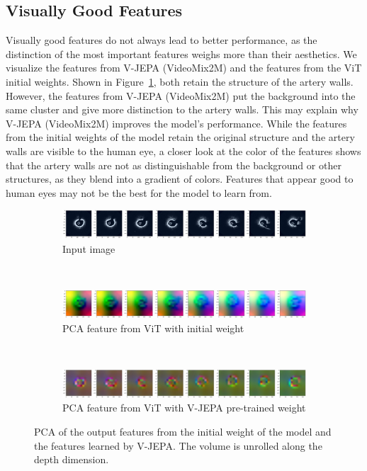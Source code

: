 \documentclass[a4paper,11pt,oneside]{report}
\begin{document}
\subsection{Visually Good Features}
Visually good features do not always lead to better performance, as the distinction of the most important features weighs more than their aesthetics. We visualize the features from V-JEPA (VideoMix2M) and the features from the ViT initial weights. Shown in Figure~\ref{fig:visually-good-features}, both retain the structure of the artery walls. However, the features from V-JEPA (VideoMix2M) put the background into the same cluster and give more distinction to the artery walls. This may explain why V-JEPA (VideoMix2M) improves the model's performance. While the features from the initial weights of the model retain the original structure and the artery walls are visible to the human eye, a closer look at the color of the features shows that the artery walls are not as distinguishable from the background or other structures, as they blend into a gradient of colors. Features that appear good to human eyes may not be the best for the model to learn from.

\begin{figure}[hbt]
    \centering
    \begin{subfigure}[t]{0.8\textwidth}
        \centering
        \includegraphics[width=0.9\linewidth]{figures/discussion_visual_vjepa_input.jpg}
        \caption{Input image}
    \end{subfigure}\\
    \begin{subfigure}[t]{0.8\textwidth}
        \centering
        \includegraphics[width=0.9\linewidth]{figures/discussion_visual_vjepa_initial.jpg}
        \caption{PCA feature from ViT with initial weight}
    \end{subfigure}\\
    \begin{subfigure}[t]{0.8\textwidth}
        \centering
        \includegraphics[width=0.9\linewidth]{figures/discussion_visual_vjepa_pretrained.jpg}
        \caption{PCA feature from ViT with V-JEPA pre-trained weight}
    \end{subfigure}
    \caption{PCA of the output features from the initial weight of the model and the features learned by V-JEPA. The volume is unrolled along the depth dimension.}
    \label{fig:visually-good-features}
\end{figure}
\end{document}

